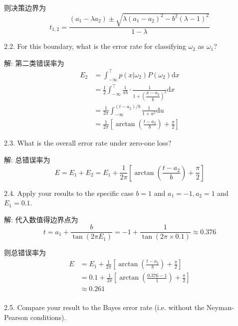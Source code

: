 \documentclass{article}
\begin{document}
则决策边界为
\begin{equation}
  t_{1,2}=\frac{(a_1-\lambda a_2)\pm\sqrt{\lambda(a_1-a_2)^2-b^2(\lambda-1)^2}}{1-\lambda}
\end{equation}

2.2. For this boundary, what is the error rate for classifying $\omega_{2}$ as $\omega_{1}$?

解: 第二类错误率为
\begin{equation}
  \begin{aligned}
    E_2
    &=\int_{-\infty}^{\top} p(x|\omega_2)P(\omega_2)\mathrm{d}x\\
    &=\frac{1}{2}\int_{-\infty}^{\top}\frac{1}{\pi b} \cdot \frac{1}{1+\left(\dfrac{x-a_2}{b}\right)^2}\mathrm{d}x\\
    &=\frac{1}{2\pi}\int_{-\infty}^{(t-a_2)/b}\frac{1}{1+u^2}\mathrm{d}u\\
    &=\frac{1}{2\pi}\left[\arctan\left(\frac{t-a_2}{b}\right)+\frac{\pi}{2}\right]
  \end{aligned}
\end{equation}

2.3. What is the overall error rate under zero-one loss?

解: 总错误率为
\begin{equation}
  E=E_1+E_2=E_1+\frac{1}{2\pi}\left[\arctan\left(\frac{t-a_2}{b}\right)+\frac{\pi}{2}\right]
\end{equation}

2.4. Apply your results to the specific case $b=1$ and $a_{1}=-1, a_{2}=1$ and $E_{1}=0.1$.

解: 代入数值得边界点为
\begin{equation}
  t=a_1+\frac{b}{\tan(2\pi E_1)}=-1+\frac{1}{\tan(2\pi\times0.1)}\approx0.376
\end{equation}

则总错误率为
\begin{equation}
  \begin{aligned}
    E
    &=E_1+\frac{1}{2\pi}\left[\arctan\left(\frac{t-a_2}{b}\right)+\frac{\pi}{2}\right]\\
    &=0.1+\frac{1}{2\pi}\left[\arctan\left(\frac{0.376-1}{1}\right)+\frac{\pi}{2}\right]\\
    &\approx0.261\\
  \end{aligned}
\end{equation}

2.5. Compare your result to the Bayes error rate (i.e. without the Neyman-Pearson conditions).
\end{document}
